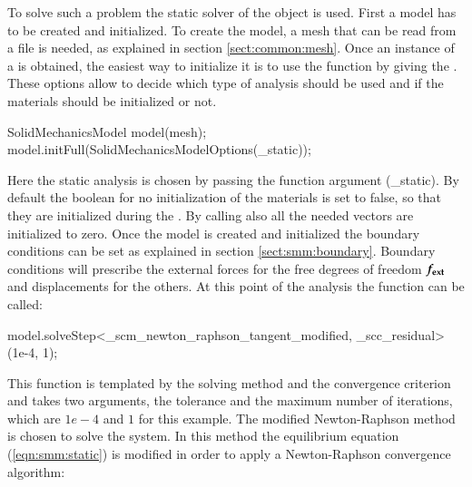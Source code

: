 To solve such a problem the static solver of the
 object is used.
First a model has to be created and initialized.  To create the model,
a mesh that can be read from a file is needed, as explained in section
\ref{sect:common:mesh}.  Once an instance of a
 is obtained, the easiest way to initialize
it is to use the 
function by giving the . These
options allow to decide which type of analysis should be used and if
the materials should be initialized or not.
\begin{cpp} SolidMechanicsModel model(mesh);
model.initFull(SolidMechanicsModelOptions(_static));
\end{cpp} Here the static analysis is chosen by passing the function
argument (\_static). By default the boolean for no initialization of
the materials is set to false, so that they are initialized during the
. By calling  also all the needed
vectors are initialized to zero.  Once the model is created and
initialized the boundary conditions can be set as explained in section
\ref{sect:smm:boundary}.  Boundary conditions will prescribe the
external forces for the free degrees of freedom $\boldsymbol{f_{{\mathrm{ext}}}}$
and displacements for the others.  At this point of the analysis the
function  can be
called:
\begin{cpp} model.solveStep<_scm_newton_raphson_tangent_modified,
_scc_residual>(1e-4, 1);
\end{cpp} This function is templated by the solving method and the
convergence criterion and takes two arguments, the tolerance and the
maximum number of iterations, which are $1e-4$ and $1$ for this
example. The modified Newton-Raphson method is chosen to solve the
system. In this method the equilibrium equation (\ref{eqn:smm:static})
is modified in order to apply a Newton-Raphson convergence algorithm:

